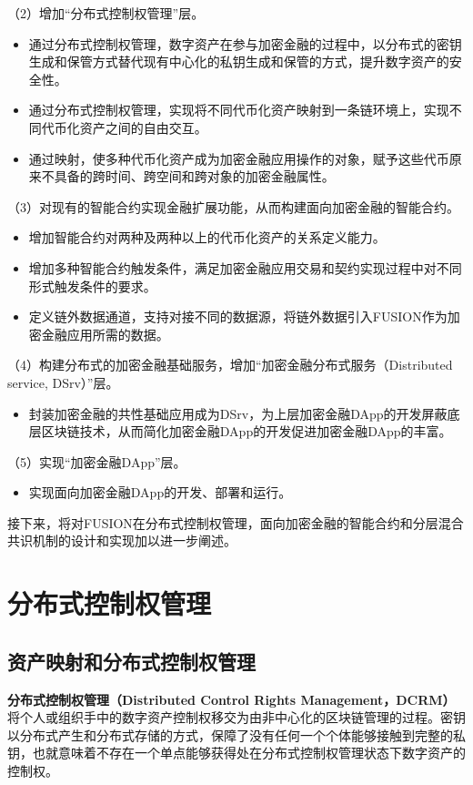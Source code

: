 \documentclass[a4paper,12pt]{article}
\begin{document}
（2）增加“分布式控制权管理”层。
\begin{itemize}[itemindent=1em]
	\item 通过分布式控制权管理，数字资产在参与加密金融的过程中，以分布式的密钥生成和保管方式替代现有中心化的私钥生成和保管的方式，提升数字资产的安全性。
	\item 通过分布式控制权管理，实现将不同代币化资产映射到一条链环境上，实现不同代币化资产之间的自由交互。
	\item 通过映射，使多种代币化资产成为加密金融应用操作的对象，赋予这些代币原来不具备的跨时间、跨空间和跨对象的加密金融属性。
\end{itemize}

（3）对现有的智能合约实现金融扩展功能，从而构建面向加密金融的智能合约。
\begin{itemize}[itemindent=1em]
	\item 增加智能合约对两种及两种以上的代币化资产的关系定义能力。
	\item 增加多种智能合约触发条件，满足加密金融应用交易和契约实现过程中对不同形式触发条件的要求。
	\item 定义链外数据通道，支持对接不同的数据源，将链外数据引入FUSION作为加密金融应用所需的数据。
\end{itemize}

（4）构建分布式的加密金融基础服务，增加“加密金融分布式服务（Distributed service, DSrv）”层。
\begin{itemize}[itemindent=1em]
	\item 封装加密金融的共性基础应用成为DSrv，为上层加密金融DApp的开发屏蔽底层区块链技术，从而简化加密金融DApp的开发促进加密金融DApp的丰富。
\end{itemize}

（5）实现“加密金融DApp”层。
\begin{itemize}[itemindent=1em]
	\item 实现面向加密金融DApp的开发、部署和运行。
\end{itemize}

接下来，将对FUSION在分布式控制权管理，面向加密金融的智能合约和分层混合共识机制的设计和实现加以进一步阐述。

\section{分布式控制权管理}
\subsection{资产映射和分布式控制权管理}
{\bfseries{分布式控制权管理（Distributed Control Rights Management，DCRM）}}将个人或组织手中的数字资产控制权移交为由非中心化的区块链管理的过程。密钥以分布式产生和分布式存储的方式，保障了没有任何一个个体能够接触到完整的私钥，也就意味着不存在一个单点能够获得处在分布式控制权管理状态下数字资产的控制权。
\end{document}
